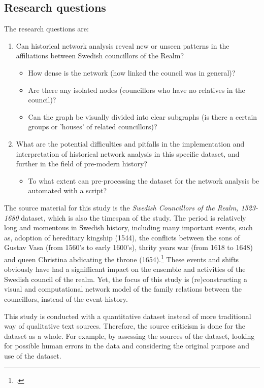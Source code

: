 \documentclass[a4paper,12pt]{article}
\begin{document}
\begin{onehalfspace}
\subsection{Research questions}
The research questions are:
\begin{enumerate}
	\item Can historical network analysis reveal new or unseen patterns in the affiliations between Swedish councillors of the Realm? \begin{itemize}
		\item How dense is the network (how linked the council was in general)?
		\item Are there any isolated nodes (councillors who have no relatives in the council)?
		\item Can the graph be visually divided into clear subgraphs (is there a certain groups or 'houses' of related councillors)?
	\end{itemize}	
	\item What are the potential difficulties and pitfalls in the implementation and interpretation of historical network analysis in this specific dataset, and further in the field of pre-modern history? \begin{itemize}	
		\item To what extent can pre-processing the dataset for the network analysis be automated with a script?
	\end{itemize}
\end{enumerate} 

The source material for this study is the \textit{Swedish Councillors of the Realm, 1523-1680} dataset, which is also the timespan of the study. The period is relatively long and momentous in Swedish history, including many important events, such as, adoption of hereditary kingship (1544), the conflicts between the sons of Gustav Vasa (from 1560's to early 1600's), thrity years war (from 1618 to 1648) and queen Christina abdicating the throne (1654).\footcite[p. 8-9.]{personalAgency} These events and shifts obviously have had a signifficant impact on the ensemble and activities of the Swedish council of the realm. Yet, the focus of this study is (re)constructing a visual and computational network model of the family relations between the councillors, instead of the event-history. 

This study is conducted with a quantitative dataset instead of more traditional way of qualitative text sources. Therefore, the source criticism is done for the dataset as a whole. For example, by assessing the sources of the dataset, looking for possible human errors in the data and considering the original purpose and use of the dataset. 


\end{onehalfspace}
\end{document}
